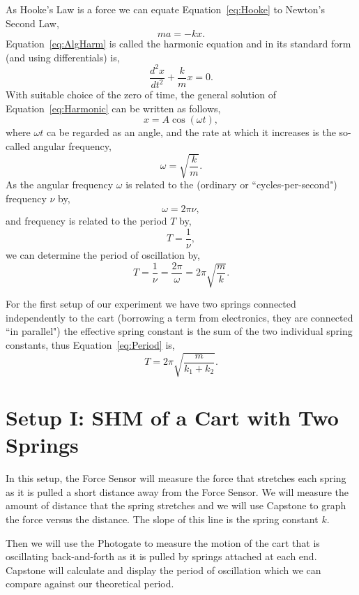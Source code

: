 \documentclass[main.tex]{subfiles}
\begin{document}
As Hooke's Law is a force we can equate Equation~\eqref{eq:Hooke} to Newton's Second Law,
\begin{equation} \label{eq:AlgHarm}
ma=-kx.
\end{equation}
Equation~\eqref{eq:AlgHarm} is called the harmonic equation and in its standard form (and using differentials) is,
\begin{equation} \label{eq:Harmonic}
\frac{d^2x}{dt^2}+\frac{k}{m}x=0.
\end{equation}
With suitable choice of the zero of time, the general solution of Equation~\eqref{eq:Harmonic} can be written as follows,
\begin{equation}
x=A\cos(\omega t),
\end{equation}
where $\omega t$ ca be regarded as an angle, and the rate at which it increases is the so-called angular frequency,
\begin{equation}
\omega=\sqrt{\frac{k}{m}}.
\end{equation}
As the angular frequency $\omega$ is related to the (ordinary or ``cycles-per-second") frequency $\nu$ by,
\[
\omega=2\pi\nu,
\]
and frequency is related to the period $T$ by,
\[
T=\frac{1}{\nu},
\]
we can determine the period of oscillation by,
\begin{equation} \label{eq:Period}
T=\frac{1}{\nu}=\frac{2\pi}{\omega}=2\pi\sqrt{\frac{m}{k}}.
\end{equation}

For the first setup of our experiment we have two springs connected independently to the cart (borrowing a term from electronics, they are connected ``in parallel") the effective spring constant is the sum of the two individual spring constants, thus Equation~\eqref{eq:Period} is,
\begin{equation} \label{eq:2SpringPeriod}
T=2\pi\sqrt{\frac{m}{k_1+k_2}}.
\end{equation}

\section{Setup I: SHM of a Cart with Two Springs}
In this setup, the Force Sensor will measure the force that stretches each spring as it is pulled a short distance away from the Force Sensor. We will measure the amount of distance that the spring stretches and we will use Capstone to graph the force versus the distance. The slope of this line is the spring constant $k.$

Then we will use the Photogate to measure the motion of the cart that is oscillating back-and-forth as it is pulled by springs attached at each end. Capstone will calculate and display the period of oscillation which we can compare against our theoretical period.
\end{document}
